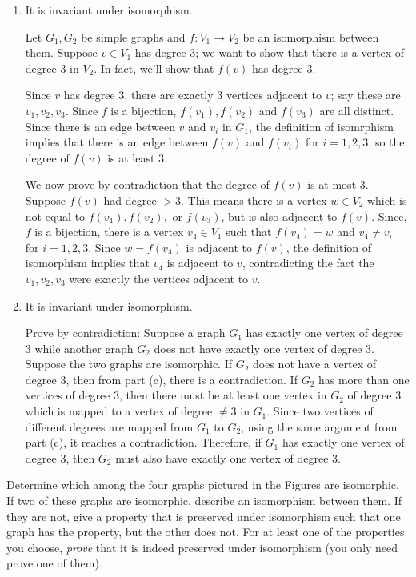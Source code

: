\documentclass[12pt,twoside]{article}
\begin{document}
\begin{problem}{15}
{\begin{enumerate}
\item
 It is invariant under isomorphism.  

Let $G_1, G_2$ be simple graphs and $f:V_1\to V_2$ be an isomorphism
between them.  Suppose $v\in V_1$ has degree 3; we want to show that there
is a vertex of degree 3 in $V_2$.  In fact, we'll show that $f(v)$ has
degree 3.
 
Since $v$ has degree 3, there are exactly 3 vertices adjacent to $v$; say
these are $v_1,v_2,v_3$.  Since $f$ is a bijection, $f(v_1),f(v_2)$ and
$f(v_3)$ are all distinct.  Since there is an edge between $v$ and $v_i$
in $G_1$, the definition of isomrphism implies that there is an edge
between $f(v)$ and $f(v_i)$ for $i=1,2,3$, so the degree of $f(v)$ is at
least 3.
 
We now prove by contradiction that the degree of $f(v)$ is at most 3.
Suppose $f(v)$ had degree $>3$.  This means there is a vertex $w \in V_2$
which is not equal to $f(v_1), f(v_2),$ or $f(v_3)$, but is also adjacent
to $f(v)$.  Since, $f$ is a bijection, there is a vertex $v_4 \in V_1$
such that $f(v_4) = w$ and $v_4 \neq v_i$ for $i=1,2,3$.  Since $w=f(v_4)$
is adjacent to $f(v)$, the definition of isomorphism implies that $v_4$ is
adjacent to $v$, contradicting the fact the $v_1,v_2,v_3$ were exactly the
vertices adjacent to $v$.

\item
  It is invariant under isomorphism.

Prove by contradiction:  Suppose a graph $G_1$ has exactly one vertex of 
degree $3$ while another graph $G_2$ does not have exactly one vertex of 
degree 3. Suppose the two graphs are isomorphic. If $G_2$ does not have 
a vertex of degree 3, then from part (c), there is a contradiction.
If $G_2$ has more than one vertices of degree 3, then there must
be at least one vertex in $G_2$ of degree 3 which is mapped to 
a vertex of degree $\neq 3$ in $G_1$. Since two vertices of different degrees
are mapped from $G_1$ to $G_2$, using the same argument from part (c),
it reaches a contradiction. Therefore, if $G_1$ has exactly one 
vertex of degree 3, then $G_2$ must also have exactly one 
vertex of degree 3.

\end{enumerate}

}
 Determine which among the four graphs pictured in the Figures 
are isomorphic.  If two of these graphs are isomorphic, describe an
isomorphism between them.  If they are not, give a property that is
preserved under isomorphism such that one graph has the property, but the
other does not.  For at least one of the properties you choose,
\emph{prove} that it is indeed preserved under isomorphism (you only need
prove one of them).


\end{problem}
\end{document}
